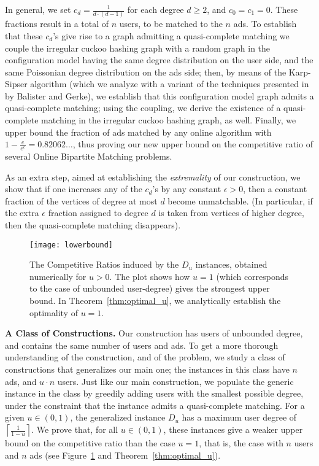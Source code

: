 \documentclass[11pt]{article}
\begin{document}
\smallskip

In general, we  set $c_d = \frac1{d \cdot (d-1)}$ for each degree $d \ge 2$, and $c_0 = c_1 = 0$. These fractions result in a total of $n$ users, to be matched to the $n$ ads.
To establish that these $c_d$'s give rise to a graph admitting a quasi-complete matching we couple the  irregular cuckoo hashing graph with a random graph in the configuration model having  the same degree distribution on the user side, and the same Poissonian degree distribution  on the ads  side; then, by means of the Karp-Sipser algorithm \cite{ks81} (which we analyze with a variant of the techniques presented in~\cite{bg15} by Balister and Gerke), we establish that this configuration model graph admits a quasi-complete matching; using the coupling, we derive the existence of a quasi-complete matching in the irregular cuckoo hashing graph, as well. Finally, we upper bound the fraction of ads matched by any online algorithm with $1- \frac e{e^e} = 0.82062\ldots$, thus proving our new upper bound on the competitive ratio of several Online Bipartite Matching problems. 

\smallskip

As an extra step, aimed at establishing the {\em extremality} of our construction, we show that if one increases any of the $c_d$'s by any constant  $\epsilon > 0$, then a constant fraction of the vertices of degree at most $d$ become unmatchable. (In particular, if the extra $\epsilon$ fraction assigned to degree $d$ is taken from vertices of higher degree, then the quasi-complete matching disappears).

\smallskip


\begin{figure}[t]
\texttt{[image: lowerbound]}
\caption{The Competitive Ratios induced by the $D_u$ instances, obtained numerically for $u > 0$. The plot shows how $u = 1$ (which corresponds to the case of unbounded user-degree) gives the strongest upper bound. In Theorem~\ref{thm:optimal_u}, we  analytically establish the optimality of $u = 1$.\label{fig:DuCR}}
\end{figure}

{\bf A Class of Constructions.} Our construction has users of unbounded  degree, and contains the same number of users and ads. To get a more thorough understanding of the construction, and of the problem, we  study a class of constructions that generalizes our main one; the instances in this class have $n$ ads, and  $u \cdot n$ users. Just like  our main construction, we  populate the generic instance in the class by  greedily adding users with the smallest possible degree, under the constraint that the instance admits a quasi-complete matching. For a given $u \in (0,1)$, the generalized instance $D_u$ has a maximum user degree of $\left\lceil\frac1{1-u}\right\rceil$. We prove that, for all $u \in (0,1)$, these instances give a weaker upper bound on the competitive ratio than the case  $u = 1$, that is,  the case with $n$ users and $n$ ads (see Figure~\ref{fig:DuCR} and Theorem~\ref{thm:optimal_u}).
\end{document}
